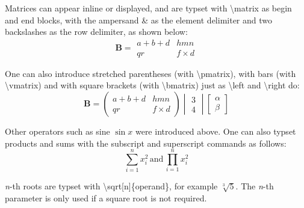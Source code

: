 \documentclass{sample}
\begin{document}
Matrices can appear inline or displayed, and are typset with \textbackslash matrix as begin and end blocks, with the ampersand \& as the element delimiter and two backslashes as the row delimiter, as shown below:
\[
\mathbf{B} =
\begin{matrix}
a + b + d & hmn\\
qr & f \times d
\end{matrix}
\]

One can also introduce stretched parentheses (with \textbackslash pmatrix), with bars (with \textbackslash vmatrix) and with square brackets (with \textbackslash bmatrix) just as \textbackslash left and \textbackslash right do:
\[
\mathbf{B} =
\begin{pmatrix}
a + b + d & hmn\\
qr & f \times d
\end{pmatrix}
\begin{vmatrix}
3\\
4
\end{vmatrix}
\begin{bmatrix}
\alpha\\
\beta
\end{bmatrix}
\]

Other operators such as sine $\sin x$ were introduced above. One can also typset products and sums with the subscript and superscript commands as follows:
\[
\sum_{i=1}^{n} x_{i}^2 \,\text{and}\, \prod_{i=1}^{n} x_{i}^2
\]

\textit{n}-th roots are typset with \textbackslash sqrt[n]\{operand\}, for example $\sqrt[3]{5}$. The \textit{n}-th parameter is only used if a square root is not required.
\end{document}
